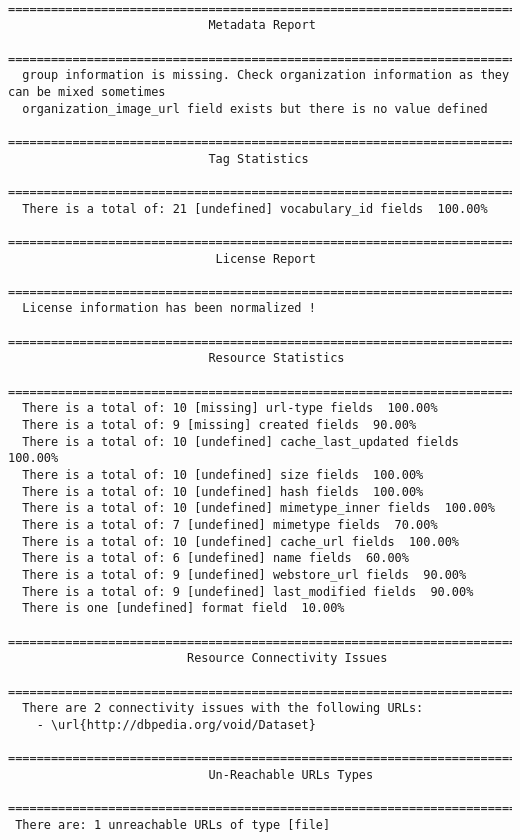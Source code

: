 \begin{lstlisting}
 =============================================================================
                            Metadata Report
 =============================================================================
  group information is missing. Check organization information as they can be mixed sometimes
  organization_image_url field exists but there is no value defined
 =============================================================================
                            Tag Statistics
 =============================================================================
  There is a total of: 21 [undefined] vocabulary_id fields  100.00%
 =============================================================================
                             License Report
 =============================================================================
  License information has been normalized !
 =============================================================================
                            Resource Statistics
 =============================================================================
  There is a total of: 10 [missing] url-type fields  100.00%
  There is a total of: 9 [missing] created fields  90.00%
  There is a total of: 10 [undefined] cache_last_updated fields  100.00%
  There is a total of: 10 [undefined] size fields  100.00%
  There is a total of: 10 [undefined] hash fields  100.00%
  There is a total of: 10 [undefined] mimetype_inner fields  100.00%
  There is a total of: 7 [undefined] mimetype fields  70.00%
  There is a total of: 10 [undefined] cache_url fields  100.00%
  There is a total of: 6 [undefined] name fields  60.00%
  There is a total of: 9 [undefined] webstore_url fields  90.00%
  There is a total of: 9 [undefined] last_modified fields  90.00%
  There is one [undefined] format field  10.00%
 =============================================================================
                         Resource Connectivity Issues
 =============================================================================
  There are 2 connectivity issues with the following URLs:
    - \url{http://dbpedia.org/void/Dataset}
 =============================================================================
                            Un-Reachable URLs Types
 =============================================================================
 There are: 1 unreachable URLs of type [file]
\end{lstlisting}


